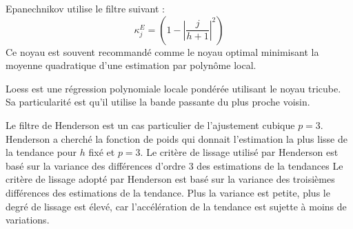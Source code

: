 \documentclass[
  12pt,
  ,
  french]{article}
\begin{document}
Epanechnikov utilise le filtre suivant :
\[\kappa_j^E=\left(
  1-
  \left\lvert
  \frac j {h+1}
  \right\lvert^2
\right)\]
Ce noyau est souvent recommandé comme le noyau optimal minimisant la moyenne quadratique d'une estimation par polynôme local.

Loess est une régression polynomiale locale pondérée utilisant le noyau tricube. Sa particularité est qu'il utilise la bande passante du plus proche voisin.

Le filtre de Henderson est un cas particulier de l'ajustement cubique \(p=3\).
Henderson a cherché la fonction de poids qui donnait l'estimation la plus lisse de la tendance pour \(h\) fixé et \(p=3\).
Le critère de lissage utilisé par Henderson est basé sur la variance des différences d'ordre 3 des estimations de la tendances
Le critère de lissage adopté par Henderson est basé sur la variance des troisièmes différences des estimations de la tendance. Plus la variance est petite, plus le degré de lissage est élevé, car l'accélération de la tendance est sujette à moins de variations.
\end{document}
